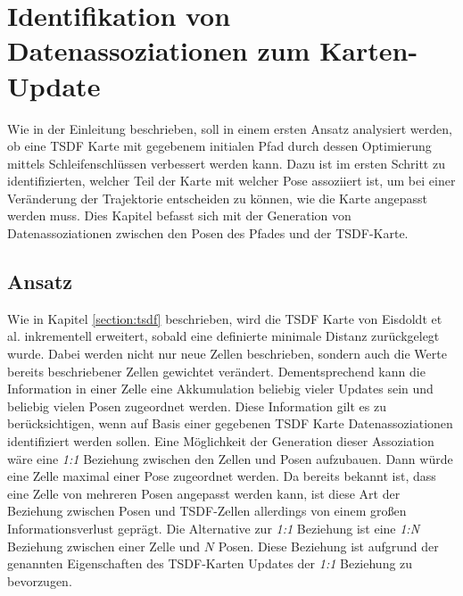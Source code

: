 \chapter{Identifikation von Datenassoziationen zum Karten-Update}\label{chapter:association}

Wie in der Einleitung beschrieben, soll in einem ersten Ansatz analysiert werden, ob eine TSDF Karte mit gegebenem initialen Pfad durch dessen Optimierung mittels Schleifenschlüssen verbessert werden kann. Dazu ist im ersten Schritt zu identifizierten, welcher Teil der Karte mit welcher Pose assoziiert ist, um bei einer Veränderung der Trajektorie entscheiden zu können, wie die Karte angepasst werden muss. Dies Kapitel befasst sich mit der Generation von Datenassoziationen zwischen den Posen des Pfades und der TSDF-Karte.

\section{Ansatz}
\label{section:ansatz}

Wie in Kapitel \ref{section:tsdf} beschrieben, wird die TSDF Karte von Eisdoldt et al. \cite{HATSDF} inkrementell erweitert, sobald eine definierte minimale Distanz zurückgelegt wurde. Dabei werden nicht nur neue Zellen beschrieben, sondern auch die Werte bereits beschriebener Zellen gewichtet verändert. Dementsprechend kann die Information in einer Zelle eine Akkumulation beliebig vieler Updates sein und beliebig vielen Posen zugeordnet werden. Diese Information gilt es zu berücksichtigen, wenn auf Basis einer gegebenen TSDF Karte Datenassoziationen identifiziert werden sollen.
Eine Möglichkeit der Generation dieser Assoziation wäre eine \emph{1:1} Beziehung zwischen den Zellen und Posen aufzubauen. Dann würde eine Zelle maximal einer Pose zugeordnet werden. Da bereits bekannt ist, dass eine Zelle von mehreren Posen angepasst werden kann, ist diese Art der Beziehung zwischen Posen und TSDF-Zellen allerdings von einem großen Informationsverlust geprägt. Die Alternative zur \emph{1:1} Beziehung ist eine \emph{1:N} Beziehung zwischen einer Zelle und $N$ Posen. Diese Beziehung ist aufgrund der genannten Eigenschaften des TSDF-Karten Updates der \emph{1:1} Beziehung zu bevorzugen.


